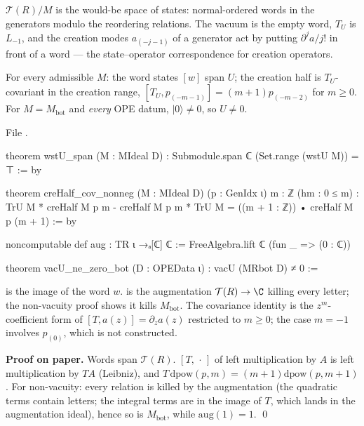 \begin{physics}
$\mathcal T(R)/M$ is the would-be space of states: normal-ordered words in the generators modulo the reordering relations. The
vacuum is the empty word, $T_U$ is $L_{-1}$, and the creation modes $a_{(-j-1)}$ of a generator act by putting $\partial^ja/j!$ in front of a
word --- the state--operator correspondence for creation operators.
\end{physics}


\begin{theorem}\label{l11:thm:URbasic}
For every admissible $M$: the word states $[w]$ span $U$; the creation half is $T_U$-covariant in the creation range,
$[T_U,p_{(-m-1)}] = (m+1)p_{(-m-2)}$ for $m\ge0$. For $M = M_{\mathrm{bot}}$ and \emph{every} OPE datum, $|0\rangle\neq0$, so $U\neq0$.
\end{theorem}
\noindent File .
\begin{leancode}
theorem wstU_span (M : MIdeal D) : Submodule.span ℂ (Set.range (wstU M)) = ⊤ := by

theorem creHalf_cov_nonneg (M : MIdeal D) (p : GenIdx ι) {m : ℤ} (hm : 0 ≤ m) :
    TrU M * creHalf M p m - creHalf M p m * TrU M = ((m + 1 : ℤ)) • creHalf M p (m + 1) := by

noncomputable def aug : TR ι →ₐ[ℂ] ℂ := FreeAlgebra.lift ℂ (fun _ => (0 : ℂ))

theorem vacU_ne_zero_bot (D : OPEData ι) : vacU (MRbot D) ≠ 0 :=
\end{leancode}

\begin{dictionary}
 is the image of the word $w$.  is the augmentation $\mathcal T(R)\to\C$ killing every letter; the
non-vacuity proof shows it kills $M_{\mathrm{bot}}$. The covariance identity is the $z^m$-coefficient form of $[T,a(z)] =
\partial_za(z)$ restricted to $m\ge0$; the case $m=-1$ involves $p_{(0)}$, which is not constructed.
\end{dictionary}

\textbf{Proof on paper.} Words span $\mathcal T(R)$. $[T,\,\cdot\,]$ of left multiplication by $A$ is left multiplication by $TA$
(Leibniz), and $T\,\mathrm{dpow}(p,m) = (m+1)\mathrm{dpow}(p,m+1)$. For non-vacuity: every relation is killed by the augmentation
(the quadratic terms contain letters; the integral terms are in the image of $T$, which lands in the augmentation ideal),
hence so is $M_{\mathrm{bot}}$, while $\mathrm{aug}(1) = 1$. \qed

